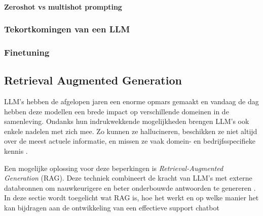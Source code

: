     
     \paragraph{Zeroshot vs multishot prompting}
     
     \subsubsection{Tekortkomingen van een LLM}
     
     
     
    \subsubsection{Finetuning}
     
     
    \subsection{Retrieval Augmented Generation}
    
    LLM's hebben de afgelopen jaren een enorme opmars gemaakt en vandaag de dag hebben deze modellen een brede impact op verschillende domeinen in de samenleving. Ondanks hun indrukwekkende mogelijkheden brengen LLM’s ook enkele nadelen met zich mee. Zo kunnen ze hallucineren, beschikken ze niet altijd over de meest actuele informatie, en missen ze vaak domein- en bedrijfsspecifieke kennis \autocite{akkiraju2024factsbuildingretrievalaugmented}.
    
    Een mogelijke oplossing voor deze beperkingen is \textit{Retrieval-Augmented Generation} (RAG). Deze techniek combineert de kracht van LLM’s met externe databronnen om nauwkeurigere en beter onderbouwde antwoorden te genereren \autocite{wu2025retrievalaugmentedgenerationnaturallanguage}. 
    In deze sectie wordt toegelicht wat RAG is, hoe het werkt en op welke manier het kan bijdragen aan de ontwikkeling van een effectieve support chatbot
    
